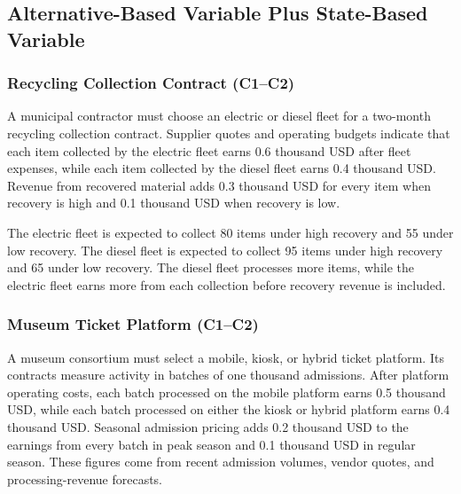 \subsection{Alternative-Based Variable Plus State-Based Variable}
	\label{sec:alternative-based-variable-payoff-plus-state-based-variable-payoff}



	\subsubsection{Recycling Collection Contract (C1--C2)}
	\label{sec:problem14-recycling-collection-contract-c1-c2}
	
	A municipal contractor must choose an electric or diesel fleet for a two-month recycling collection contract. Supplier quotes and operating budgets indicate that each item collected by the electric fleet earns 0.6 thousand USD after fleet expenses, while each item collected by the diesel fleet earns 0.4 thousand USD. Revenue from recovered material adds 0.3 thousand USD for every item when recovery is high and 0.1 thousand USD when recovery is low.
	
	The electric fleet is expected to collect 80 items under high recovery and 55 under low recovery. The diesel fleet is expected to collect 95 items under high recovery and 65 under low recovery. The diesel fleet processes more items, while the electric fleet earns more from each collection before recovery revenue is included.
	
	\subsubsection{Museum Ticket Platform (C1--C2)}
	\label{sec:problem15-museum-ticket-platform-c1-c2}
	
	A museum consortium must select a mobile, kiosk, or hybrid ticket platform. Its contracts measure activity in batches of one thousand admissions. After platform operating costs, each batch processed on the mobile platform earns 0.5 thousand USD, while each batch processed on either the kiosk or hybrid platform earns 0.4 thousand USD. Seasonal admission pricing adds 0.2 thousand USD to the earnings from every batch in peak season and 0.1 thousand USD in regular season. These figures come from recent admission volumes, vendor quotes, and processing-revenue forecasts.
	
